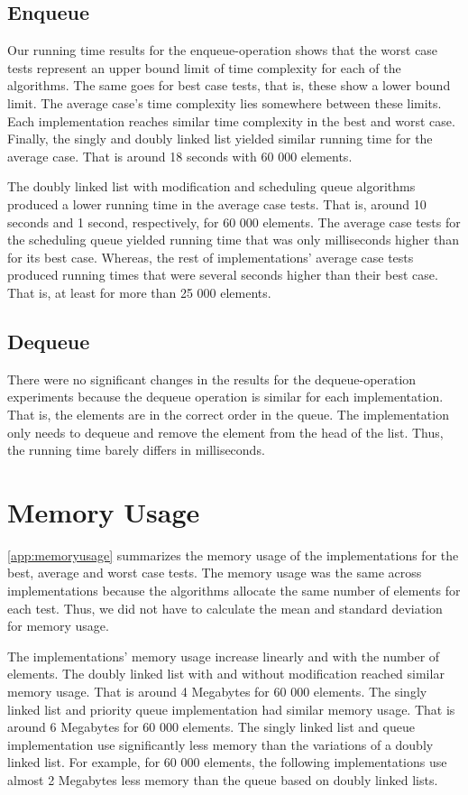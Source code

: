 \documentclass[a4paper,11pt]{kth-mag}
\newcommand*{\skippara}{\par\vspace{\baselineskip} \noindent}
\begin{document}
\subsection{Enqueue}
Our running time results for the enqueue-operation shows that the worst case tests represent an upper bound limit of time complexity for each of the algorithms.
The same goes for best case tests, that is, these show a lower bound limit.
The average case's time complexity lies somewhere between these limits.
Each implementation reaches similar time complexity in the best and worst case.
Finally, the singly and doubly linked list yielded similar running time for the average case.
That is around 18 seconds with 60 000 elements.

\skippara The doubly linked list with modification and scheduling queue algorithms produced a lower running time in the average case tests.
That is, around 10 seconds and 1 second, respectively, for 60 000 elements.
The average case tests for the scheduling queue yielded running time that was only milliseconds higher than for its best case.
Whereas, the rest of implementations' average case tests produced running times that were several seconds higher than their best case.
That is, at least for more than 25 000 elements.

\subsection{Dequeue}
There were no significant changes in the results for the dequeue-operation experiments because the dequeue operation is similar for each implementation.
That is, the elements are in the correct order in the queue.
The implementation only needs to dequeue and remove the element from the head of the list.
Thus, the running time barely differs in milliseconds.

\section{Memory Usage}
\cref{app:memoryusage} summarizes the memory usage of the implementations for the best, average and worst case tests.
The memory usage was the same across implementations because the algorithms allocate the same number of elements for each test.
Thus, we did not have to calculate the mean and standard deviation for memory usage.

\skippara The implementations' memory usage increase linearly and with the number of elements.
The doubly linked list with and without modification reached similar memory usage.
That is around 4 Megabytes for 60 000 elements.
The singly linked list and priority queue implementation had similar memory usage.
That is around 6 Megabytes for 60 000 elements.
The singly linked list and queue implementation use significantly less memory than the variations of a doubly linked list.
For example, for 60 000 elements, the following implementations use almost 2 Megabytes less memory than the queue based on doubly linked lists.
\end{document}
